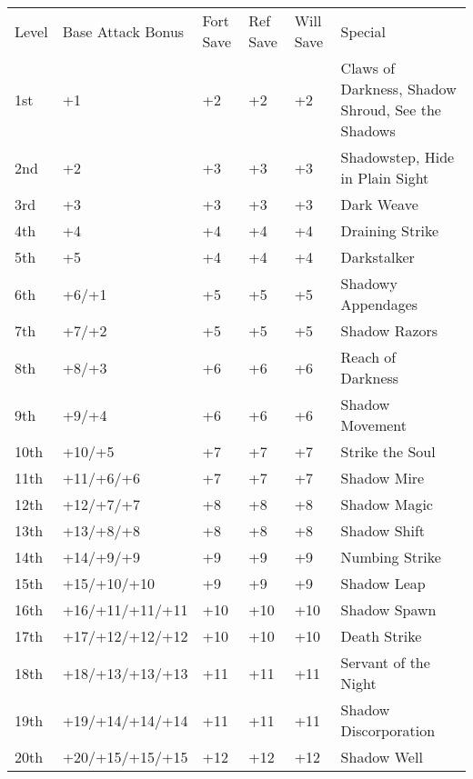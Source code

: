  \label{comm:class:shadowwarrior}
\vspace*{-8pt}









\begin{table}[tbh]
\begin{small}
\begin{tabular}{lp{3cm}p{0.7cm}p{0.7cm}p{0.7cm}l}
Level &Base Attack Bonus &Fort Save &Ref Save &Will Save &Special\\
1st &+1 &+2 &+2 &+2 &Claws of Darkness, Shadow Shroud, See the Shadows\\
2nd &+2 &+3 &+3 &+3 &Shadowstep, Hide in Plain Sight\\
3rd &+3 &+3 &+3 &+3 &Dark Weave\\
4th &+4 &+4 &+4 &+4 &Draining Strike\\
5th &+5 &+4 &+4 &+4 &Darkstalker\\
6th &+6/+1 &+5 &+5 &+5 &Shadowy Appendages\\
7th &+7/+2 &+5 &+5 &+5 &Shadow Razors\\
8th &+8/+3 &+6 &+6 &+6 &Reach of Darkness\\
9th &+9/+4 &+6 &+6 &+6 &Shadow Movement\\
10th &+10/+5 &+7 &+7 &+7 &Strike the Soul\\
11th &+11/+6/+6 &+7 &+7 &+7 &Shadow Mire\\
12th &+12/+7/+7 &+8 &+8 &+8 &Shadow Magic\\
13th &+13/+8/+8 &+8 &+8 &+8 &Shadow Shift\\
14th &+14/+9/+9 &+9 &+9 &+9 &Numbing Strike\\
15th &+15/+10/+10 &+9 &+9 &+9 &Shadow Leap\\
16th &+16/+11/+11/+11 &+10 &+10 &+10 &Shadow Spawn\\
17th &+17/+12/+12/+12 &+10 &+10 &+10 &Death Strike\\
18th &+18/+13/+13/+13 &+11 &+11 &+11 &Servant of the Night\\
19th &+19/+14/+14/+14 &+11 &+11 &+11 &Shadow Discorporation\\
20th &+20/+15/+15/+15 &+12 &+12 &+12 &Shadow Well
\end{tabular}
\end{small}
\end{table}

